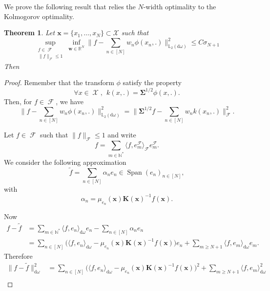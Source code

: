 \documentclass[twoside,11pt]{book}
\newtheorem{theorem}{Theorem}
\numberwithin{theorem}{chapter}
\numberwithin{definition}{chapter}
\numberwithin{proposition}{chapter}
\numberwithin{corollary}{chapter}
\numberwithin{example}{chapter}
\numberwithin{lemma}{chapter}
\numberwithin{assumption}{chapter}
\numberwithin{equation}{chapter}
\numberwithin{figure}{chapter}
\DeclareMathOperator{\Span}{\mathrm{Span}}
\DeclareMathOperator{\F}{\mathcal{F}}
\DeclareMathOperator{\X}{\mathcal{X}}
\begin{document}
We prove the following result that relies the $N$-width optimality to the Kolmogorov optimality.

\begin{theorem}
Let $\bm{x} = \{ x_{1}, \dots, x_{N}\} \subset \mathcal{X}$ such that
\begin{equation}
\sup\limits_{\substack{f \in \F\\ \|f\|_{\F} \leq 1}}  \inf\limits_{\bm{w} \in \mathbb{R}^{N}} \|f - \sum\limits_{n \in [N]} w_{n}\phi(x_n,.)\|_{\mathbb{L}_{2}(\mathrm{d}\omega)}^{2} \leq C \sigma_{N+1}  
\end{equation} 
Then
\end{theorem}


\begin{proof}
Remember that the transform $\phi$ satisfy the property
\begin{equation}
\forall x \in \X, \:\: k(x,.) = \bm{\Sigma}^{1/2} \phi(x,.).
\end{equation}
Then, for $f \in \F$, we have
\begin{equation}
\|f - \sum\limits_{n \in [N]} w_{n}\phi(x_n,.)\|_{\mathbb{L}_{2}(\mathrm{d}\omega)}^{2} = \|\bm{\Sigma}^{1/2}f - \sum\limits_{n \in [N]} w_{n}k(x_n,.)\|_{\F}^{2}.
\end{equation}


Let $f \in \F$ such that $\|f\|_{\F} \leq 1$ and write 
\begin{equation}
f = \sum\limits_{m \in \mathbb{N}^{*}} \langle f,e_{m}^{\F} \rangle_{\F} e_{m}^{\F}.
\end{equation}
We consider the following approximation 
\begin{equation}
\tilde{f} = \sum\limits_{n \in [N]} \alpha_n e_{n} \in \Span (e_{n})_{n \in [N]},
\end{equation}
with
\begin{equation}
\alpha_n =  \mu_{e_{n}}(\bm{x})\bm{K}(\bm{x})^{-1}f(\bm{x}) .
\end{equation}

Now
\begin{align}
f-\tilde{f}  &= \sum\limits_{m \in \mathbb{N}^{*}} \langle f,e_{n}\rangle_{\mathrm{d}\omega} e_{n} - \sum\limits_{n \in [N]} \alpha_{n} e_{n} \nonumber \\
& = \sum\limits_{n \in [N]}  \big( \langle f,e_{n}\rangle_{\mathrm{d}\omega}- \mu_{e_{n}}(\bm{x})\bm{K}(\bm{x})^{-1}f(\bm{x})\big) e_{n} + \sum\limits_{m \geq N+1} \langle f,e_{m} \rangle_{\mathrm{d}\omega} e_{m}.
\end{align}
Therefore
\begin{align}
\|f-\tilde{f}\|_{\mathrm{d}\omega}^{2} & = \sum\limits_{n \in [N]} \big( \langle f,e_{n}\rangle_{\mathrm{d}\omega}- \mu_{e_{n}}(\bm{x})\bm{K}(\bm{x})^{-1}f(\bm{x})\big)^{2} + \sum\limits_{m \geq N+1} \langle f,e_{m} \rangle_{\mathrm{d}\omega}^{2} \nonumber \\
& 
\end{align}
\end{proof}
\end{document}
